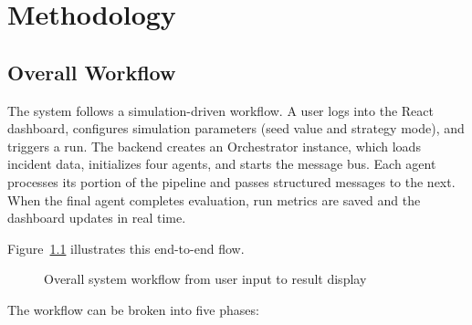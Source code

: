 \chapter{Methodology}
\label{ch:methodology}

\section{Overall Workflow}
\label{sec:overall_workflow}

The system follows a simulation-driven workflow. A user logs into the React dashboard, configures simulation parameters (seed value and strategy mode), and triggers a run. The backend creates an Orchestrator instance, which loads incident data, initializes four agents, and starts the message bus. Each agent processes its portion of the pipeline and passes structured messages to the next. When the final agent completes evaluation, run metrics are saved and the dashboard updates in real time.

Figure~\ref{fig:overall_workflow} illustrates this end-to-end flow.

\begin{figure}[H]
\centering
{}
\caption{Overall system workflow from user input to result display}
\label{fig:overall_workflow}
\end{figure}

The workflow can be broken into five phases:


